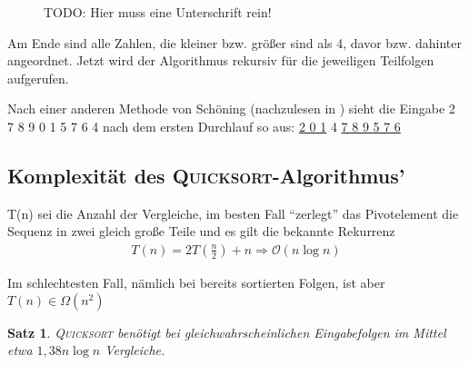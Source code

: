 \documentclass[ngerman,draft,parskip=half*,twoside]{scrreprt}
\theoremstyle{break}
\newtheorem{satz}{Satz}[chapter]
\theoremstyle{nonumberbreak}
\newcommand*{\OO}{\mathcal{O}}      %
\begin{document}
%
\begin{figure}[H]
  \centering
  
\caption{TODO: Hier muss eine Unterschrift rein!}
  \label{031103a}
\end{figure}

Am Ende sind alle Zahlen, die kleiner bzw. größer sind als 4, davor bzw. dahinter angeordnet. 
Jetzt wird der Algorithmus rekursiv für die jeweiligen Teilfolgen aufgerufen.

Nach einer anderen Methode von Schöning (nachzulesen in \cite{sedgewick}) sieht die Eingabe 2 7 8 9 0 1 5 7 6 4 nach dem ersten Durchlauf so aus: 
\underline{2 0 1} 4 \underline{7 8 9 5 7 6}

\subsection{Komplexität des \textsc{Quicksort}-Algorithmus'}

T(n) sei die Anzahl der Vergleiche, im besten Fall "`zerlegt"' das Pivotelement die Sequenz in zwei gleich große Teile und es gilt die
bekannte Rekurrenz
\begin{gather*}
T(n)=2T(\frac{n}{2})+n \Rightarrow \OO(n \log n)
\end{gather*}

Im schlechtesten Fall, nämlich bei bereits sortierten Folgen, ist aber $T(n) \in \Omega(n^2)$ 

\begin{satz}
\textsc{Quicksort} benötigt bei gleichwahrscheinlichen Eingabefolgen im Mittel etwa $1,38 n \log n$ Vergleiche.
\end{satz}
\end{document}
